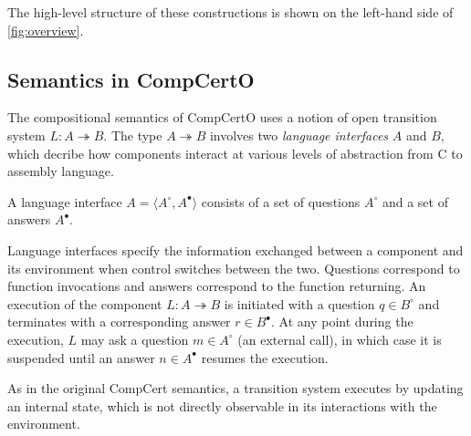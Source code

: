\documentclass[acmsmall,screen,review,anonymous]{acmart}
\newcommand{\que}{\circ}
\newcommand{\ans}{\bullet}
\begin{document}
The high-level structure of these constructions
is shown on the left-hand side of \autoref{fig:overview}.

\subsection{Semantics in CompCertO} \label{sec:basic:compcerto} %

The compositional semantics of CompCertO uses %
a notion of open transition system $L : A \twoheadrightarrow B$.
The type $A \twoheadrightarrow B$ involves
two \emph{language interfaces} $A$ and $B$,
which decribe how components interact at various levels of abstraction
from C to assembly language.

\begin{definition} \label{def:li}
A language interface $A = \langle A^\que, A^\ans \rangle$
consists of a set of questions $A^\que$ and a set of answers $A^\ans$.
\end{definition}

Language interfaces specify the information exchanged between
a component and its environment
when control switches between the two.
Questions correspond to function invocations
and answers correspond to the function returning.
An execution of the component $L : A \twoheadrightarrow B$
is initiated with a question $q \in B^\que$
and terminates with a corresponding answer $r \in B^\ans$.
At any point during the execution,
$L$ may ask a question $m \in A^\que$ (an external call),
in which case it is suspended until an answer $n \in A^\ans$
resumes the execution.

As in the original CompCert semantics,
a transition system
executes by updating an internal state,
which is not directly observable
in its interactions with the environment.
\end{document}
